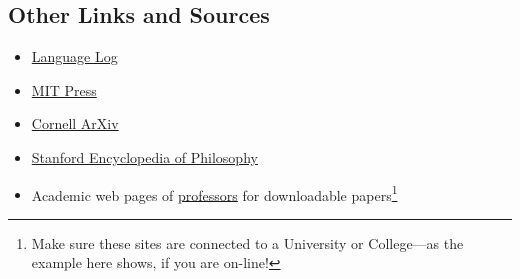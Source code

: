 \documentclass[11pt]{article}
\begin{document}
\subsection{Other Links and Sources}
\begin{itemize}
\item \href{http://languagelog.ldc.upenn.edu/nll/}{Language Log}
\item \href{http://mitpress.mit.edu}{MIT Press} 
\item \href{http://arxiv.org}{Cornell ArXiv} 
\item \href{http://plato.stanford.edu/}{Stanford Encyclopedia of Philosophy} 
\item Academic web pages of \href{http://www.uvu.edu/profpages/profiles/show/user_id/530}{professors} 
for downloadable papers\footnote{Make sure these sites are connected to a University or College---as 
the example here shows, if you are on-line!}
\end{itemize}
\end{document}
